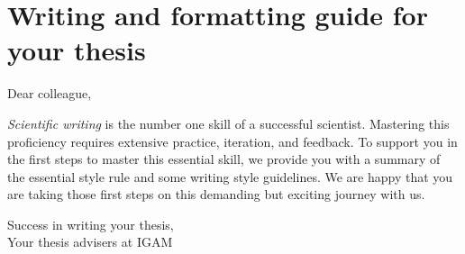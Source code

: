 \setcounter{chapter}{-1}
\chapter{Writing and formatting guide for your thesis}


\vspace{-3mm}
Dear colleague,

\textit{Scientific writing} is the number one skill of a successful scientist. Mastering this proficiency requires extensive practice, iteration, and feedback. To support you in the first steps to master this essential skill, we provide you with a summary of the essential style rule and some writing style guidelines. We are happy that you are taking those first steps on this demanding but exciting journey with us. 


\vspace{-3mm}
\begin{flushright}
Success in writing your thesis, \\
Your thesis advisers at IGAM\\
\end{flushright}

\noindent {}


\vspace{-5mm}
